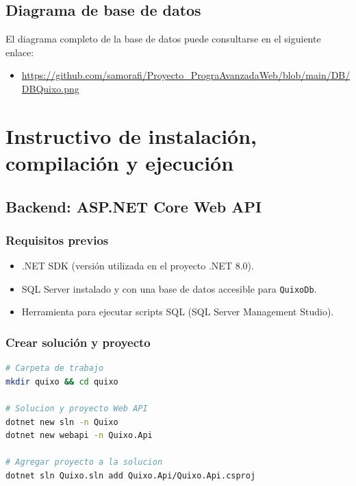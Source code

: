 \documentclass[11pt,a4paper]{article}
\begin{document}
\subsection{Diagrama de base de datos}

El diagrama completo de la base de datos puede consultarse en el siguiente enlace:

\begin{itemize}
    \item \url{https://github.com/samorafi/Proyecto_PrograAvanzadaWeb/blob/main/DB/DBQuixo.png}
\end{itemize}

\section{Instructivo de instalación, compilación y ejecución}

\subsection{Backend: ASP.NET Core Web API}

\subsubsection{Requisitos previos}

\begin{itemize}
    \item .NET SDK (versión utilizada en el proyecto .NET 8.0).
    \item SQL Server instalado y con una base de datos accesible para \texttt{QuixoDb}.
    \item Herramienta para ejecutar scripts SQL (SQL Server Management Studio).
\end{itemize}

\subsubsection{Crear solución y proyecto}

\begin{lstlisting}[language=bash]
# Carpeta de trabajo
mkdir quixo && cd quixo

# Solucion y proyecto Web API
dotnet new sln -n Quixo
dotnet new webapi -n Quixo.Api

# Agregar proyecto a la solucion
dotnet sln Quixo.sln add Quixo.Api/Quixo.Api.csproj
\end{lstlisting}
\end{document}
